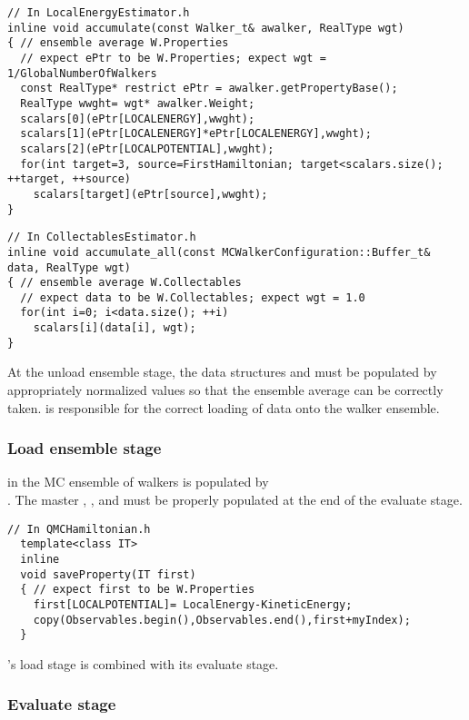 \begin{lstlisting}
// In LocalEnergyEstimator.h
inline void accumulate(const Walker_t& awalker, RealType wgt)
{ // ensemble average W.Properties
  // expect ePtr to be W.Properties; expect wgt = 1/GlobalNumberOfWalkers
  const RealType* restrict ePtr = awalker.getPropertyBase();
  RealType wwght= wgt* awalker.Weight;
  scalars[0](ePtr[LOCALENERGY],wwght);
  scalars[1](ePtr[LOCALENERGY]*ePtr[LOCALENERGY],wwght);
  scalars[2](ePtr[LOCALPOTENTIAL],wwght);
  for(int target=3, source=FirstHamiltonian; target<scalars.size(); ++target, ++source)
    scalars[target](ePtr[source],wwght);
}
\end{lstlisting}

\begin{lstlisting}
// In CollectablesEstimator.h
inline void accumulate_all(const MCWalkerConfiguration::Buffer_t& data, RealType wgt)
{ // ensemble average W.Collectables
  // expect data to be W.Collectables; expect wgt = 1.0
  for(int i=0; i<data.size(); ++i)
    scalars[i](data[i], wgt);
}
\end{lstlisting}

At the unload ensemble stage, the data structures  and  must be populated by appropriately normalized values so that the ensemble average can be correctly taken.  is responsible for the correct loading of data onto the walker ensemble.

\subsubsection{Load ensemble stage}
 in the MC ensemble of walkers  is populated by \\ . The master , , and  must be properly populated at the end of the evaluate stage.
\begin{lstlisting}
// In QMCHamiltonian.h
  template<class IT>
  inline
  void saveProperty(IT first)
  { // expect first to be W.Properties
    first[LOCALPOTENTIAL]= LocalEnergy-KineticEnergy;
    copy(Observables.begin(),Observables.end(),first+myIndex);
  }
\end{lstlisting}

's load stage is combined with its evaluate stage.

\subsubsection{Evaluate stage}

